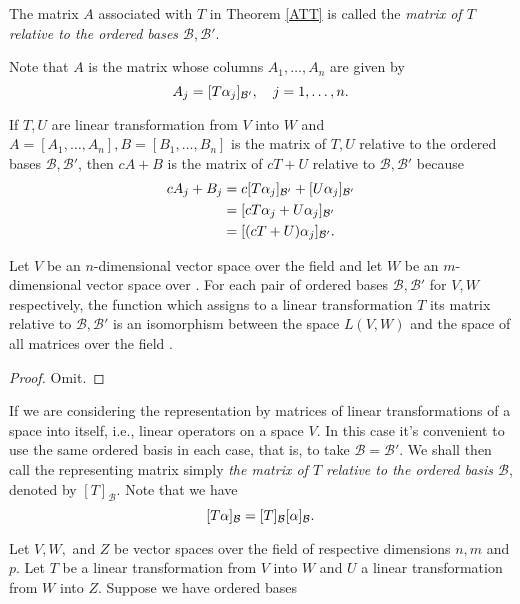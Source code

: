 \documentclass{mynotes}
\begin{document}
\begin{definition}
The matrix $A$ associated with $T$ in Theorem \ref{ATT} is called the \emph{matrix of $T$ relative to the ordered bases $\mathcal{B},\mathcal{B}'$}.
\end{definition}
\begin{remark}
Note that $A$ is the matrix whose columns $A_1,\ldots,A_n$ are given by $$A_j=[T\alpha_j]_{\mathcal{B}'},\quad j=1,\ldots,n.$$
\end{remark}
\begin{remark}
If $T,U$ are linear transformation from $V$ into $W$ and $A=[A_1,\ldots,A_n],B=[B_1,\ldots,B_n]$ is the matrix of $T,U$ relative to the ordered bases $\mathcal{B},\mathcal{B}'$, then $cA+B$ is the matrix of $cT+U$ relative to $\mathcal{B},\mathcal{B}'$ because
\begin{align*}
cA_j+B_j &= c[T\alpha_j]_{\mathcal{B}'}+[U\alpha_j]_{\mathcal{B}'}\\&=[cT\alpha_j+U\alpha_j]_{\mathcal{B}'}\\&=[(cT+U)\alpha_j]_{\mathcal{B}'}.
\end{align*}
\end{remark}
\begin{theorem}
Let $V$ be an $n$-dimensional vector space over the field \F and let $W$ be an $m$-dimensional vector space over \F. For each pair of ordered bases $\mathcal{B},\mathcal{B}'$ for $V,W$ respectively, the function which assigns to a linear transformation $T$ its matrix relative to $\mathcal{B},\mathcal{B}'$ is an isomorphism between the space $L(V,W)$ and the space of all \mbyn{} matrices over the field \F.
\end{theorem}
\begin{proof}
Omit.
\end{proof}
\begin{remark}
If we are considering the representation by matrices of linear transformations of a space into itself, i.e., linear operators on a space $V$. In this case it's convenient to use the same ordered basis in each case, that is, to take $\mathcal{B}=\mathcal{B'}$. We shall then call the representing matrix simply \emph{the matrix of $T$ relative to the ordered basis $\mathcal{B}$}, denoted by $[T]_{\mathcal{B}}$. Note that we have$$[T\alpha]_{\mathcal{B}}=[T]_{\mathcal{B}}[\alpha]_{\mathcal{B}}.$$
\end{remark}
Let $V,W,$ and $Z$ be vector spaces over the field \F of respective dimensions $n,m$ and$p$. Let $T$ be a linear transformation from $V$ into $W$ and $U$ a linear transformation from $W$ into $Z$. Suppose we have ordered bases
\end{document}
